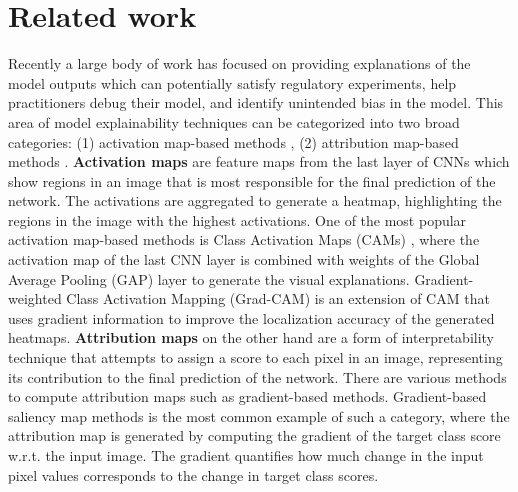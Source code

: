 \documentclass[11pt]{article}
\begin{document}
\section{Related work}
Recently a large body of work has focused on providing explanations of the model outputs which can potentially satisfy regulatory experiments, help practitioners debug their model, and identify unintended bias in the model. This area of model explainability techniques can be categorized into two broad categories: (1) activation map-based methods \cite{zhou2016learning, selvaraju2016grad}, (2) attribution map-based methods \cite{simonyan2013deep, baehrens2010explain}.  \newline
\textbf{Activation maps} are feature maps from the last layer of CNNs which show regions in an image that is most responsible for the final prediction of the network. The activations are aggregated to generate a heatmap, highlighting the regions in the image with the highest activations. One of the most popular activation map-based methods is Class Activation Maps (CAMs) \cite{zhou2016learning}, where the activation map of the last CNN layer is combined with weights of the Global Average Pooling (GAP) layer to generate the visual explanations. Gradient-weighted Class Activation Mapping (Grad-CAM) \cite{selvaraju2016grad} is an extension of CAM that uses gradient information to improve the localization accuracy of the generated heatmaps. \textbf{Attribution maps} on the other hand are a form of interpretability technique that attempts to assign a score to each pixel in an image, representing its contribution to the final prediction of the network. There are various methods to compute attribution maps such as gradient-based methods. Gradient-based saliency map methods \cite{simonyan2013deep,baehrens2010explain} is the most common example of such a category, where the attribution map is generated by computing the gradient of the target class score w.r.t. the input image. The gradient quantifies how much change in the input pixel values corresponds to the change in target class scores. \newline
\end{document}
